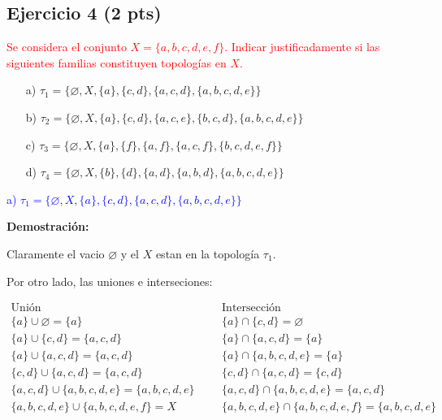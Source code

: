 \documentclass[
]{article}
\begin{document}
\hypertarget{ejercicio-4-2-pts}{%
\subsection{Ejercicio 4 (2 pts)}\label{ejercicio-4-2-pts}}

\textcolor{red}{Se considera el conjunto $X=\{a,b,c,d,e,f \}$. Indicar justificadamente si las siguientes familias constituyen topologías en $X$.}

\begin{itemize}
\item [a)] $\tau_{1} =\{ \varnothing,X,\{a\},\{c,d\},\{a,c,d\},\{a,b,c,d,e\}\}$
\item [b)] $\tau_{2} =\{ \varnothing,X,\{a\},\{c,d\},\{a,c,e\},\{b,c,d\},\{a,b,c,d,e\}\}$
\item [c)] $\tau_{3} =\{ \varnothing,X,\{a\},\{f\},\{a,f\},\{a,c,f\},\{b,c,d,e,f\}\}$
\item [d)]$\tau_{4} =\{ \varnothing,X,\{b\},\{d\},\{a,d\},\{a,b,d\},\{a,b,c,d,e\}\}$
\end{itemize}

\textcolor{blue}{a) $\tau_{1} =\{ \varnothing,X,\{a\},\{c,d\},\{a,c,d\},\{a,b,c,d,e\}\}$}

\textbf{Demostración:}

Claramente el vacio \(\varnothing\) y el \(X\) estan en la topología
\(\tau_1\).

Por otro lado, las uniones e interseciones:

\begin{align*}
\mbox{Unión}                               &        &          &\mbox{Intersección} \\
\{a\} \cup \varnothing =\{a\}              &        &          &\{a\} \cap \{c,d\}=\varnothing \\
\{a\} \cup \{c,d\}=\{a,c,d\}               &        &          &\{a\} \cap \{a,c,d\}=\{a\} \\
\{a\} \cup \{a,c,d\}=\{a,c,d\}             &        &          &\{a\} \cap \{a,b,c,d,e\}=\{a\} \\
\{c,d\} \cup \{a,c,d\}=\{a,c,d\}           &        &          &\{c,d\} \cap \{a,c,d\}=\{c,d\} \\
\{a,c,d\} \cup \{a,b,c,d,e\}=\{a,b,c,d,e\} &        &          &\{a,c,d\} \cap \{a,b,c,d,e\}=\{a,c,d\} \\
\{a,b,c,d,e\} \cup \{a,b,c,d,e,f\}= X      &        &          &\{a,b,c,d,e\} \cap \{a,b,c,d,e,f\}=\{a,b,c,d,e\} 
\end{align*}
\end{document}
